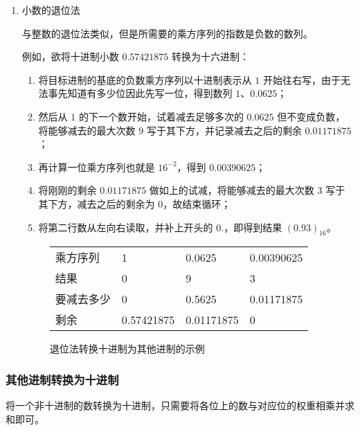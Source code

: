 \begin{enumerate}
                \item 小数的退位法

                    与整数的退位法类似，但是所需要的乘方序列的指数是负数的数列。

                    例如，欲将十进制小数 $0.57421875$ 转换为十六进制：

                    \begin{enumerate}
                        \item 将目标进制的基底的负数乘方序列以十进制表示从 $1$ 开始往右写，由于无法事先知道有多少位因此先写一位，得到数列 $1$、$0.0625$；
                        \item 然后从 $1$ 的下一个数开始，试着减去足够多次的 $0.0625$ 但不变成负数，将能够减去的最大次数 $9$ 写于其下方，并记录减去之后的剩余 $0.01171875$；
                        \item 再计算一位乘方序列也就是 $16^{-2}$，得到 $0.00390625$；
                        \item 将刚刚的剩余 $0.01171875$ 做如上的试减，将能够减去的最大次数 $3$ 写于其下方，减去之后的剩余为 $0$，故结束循环；
                        \item 将第二行数从左向右读取，并补上开头的 $0.$，即得到结果 $(0.93)_{16}$。
                    \end{enumerate}

                    \begin{figure}
                        \centering
                        \begin{tabular}{llll}
                            乘方序列   & 1          & 0.0625     & 0.00390625 \\
                            结果       & 0          &          9 &          3 \\ \hline
                            要减去多少 & 0          & 0.5625     & 0.01171875 \\
                            剩余       & 0.57421875 & 0.01171875 & 0
                        \end{tabular}
                        \caption{退位法转换十进制为其他进制的示例}
                        \label{fig:ArithBasics/positional-notation-presentation-and-conversion/conversion/from-decimal/descending-subtraction-fractal}
                    \end{figure}
            \end{enumerate}
        \subsubsection{其他进制转换为十进制}\label{subsubsec:ArithBasics/positional-notation-presentation-and-conversion/conversion/to-decimal}
            将一个非十进制的数转换为十进制，只需要将各位上的数与对应位的权重相乘并求和即可。

